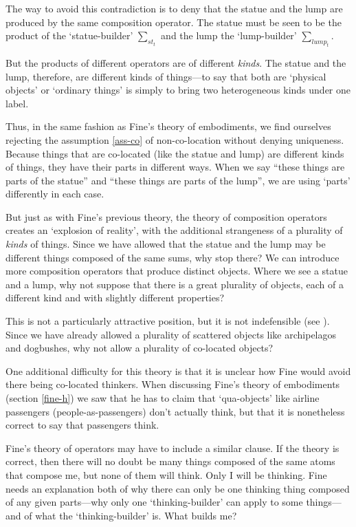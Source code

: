 \documentclass[11pt]{article}
\begin{document}
\begin{spacing}{1.5}
The way to avoid this contradiction is to deny that the statue and the
lump are produced by the same composition operator.  The statue must
be seen to be the product of the `statue-builder' $\sum _{st_t}$ and
the lump the `lump-builder' $\sum _{lump_t}$.

But the products of different operators are of different {\em kinds}.
The statue and the lump, therefore, are different kinds of things---to
say that both are `physical objects' or `ordinary things' is simply to
bring two heterogeneous kinds under one label.

Thus, in the same fashion as Fine's theory of embodiments, we find
ourselves rejecting the assumption \ref{ass-co} of non-co-location
without denying uniqueness.  Because things that are co-located (like
the statue and lump) are different kinds of things, they have their
parts in different ways.  When we say ``these things are parts of the
statue'' and ``these things are parts of the lump'', we are using
`parts' differently in each case.

But just as with Fine's previous theory, the theory of composition
operators creates an `explosion of reality', with the additional
strangeness of a plurality of {\em kinds} of things.  Since we have
allowed that the statue and the lump may be different things composed
of the same sums, why stop there?  We can introduce more composition
operators that produce distinct objects.  Where we see a statue and a
lump, why not suppose that there is a great plurality of objects, each
of a different kind and with slightly different properties?

This is not a particularly attractive position, but it is not
indefensible (see \citet[section 4]{bennett2004}).  Since we have
already allowed a plurality of scattered objects like archipelagos and
dogbushes, why not allow a plurality of co-located objects?

One additional difficulty for this theory is that it is unclear how
Fine would avoid there being co-located thinkers.  When discussing
Fine's theory of embodiments (section \ref{fine-h}) we saw that he has
to claim that `qua-objects' like airline passengers
(people-as-passengers) don't actually think, but that it is
nonetheless correct to say that passengers think.

Fine's theory of operators may have to include a similar clause.  If
the theory is correct, then there will no doubt be many things
composed of the same atoms that compose me, but none of them will
think.  Only I will be thinking.  Fine needs an explanation both of
why there can only be one thinking thing composed of any given
parts---why only one `thinking-builder' can apply to some things---and
of what the `thinking-builder' is.  What builds me?


\end{spacing}
\end{document}
